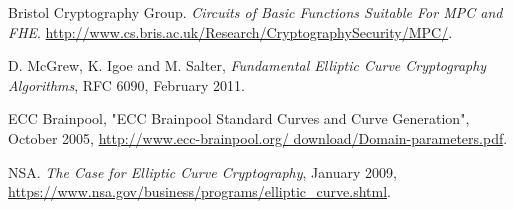 \documentclass[ %
                    author={Nicholas Tutte},
                supervisor={Prof. Nigel Smart},
                    degree={MEng},
                     title={Secure Two Party Computation},
                  subtitle={A practical comparison of recent protocols},
                      type={Research - GG1K},
                      year={2015} ]{dissertation}
\begin{document}
\begin{thebibliography}{99}
			Bristol Cryptography Group. \emph{Circuits of Basic Functions Suitable For MPC and FHE}.  \url{http://www.cs.bris.ac.uk/Research/CryptographySecurity/MPC/}. 

			D. McGrew, K. Igoe and M. Salter,\emph{ Fundamental Elliptic Curve Cryptography Algorithms}, RFC 6090, February 2011.

			ECC Brainpool, "ECC Brainpool Standard Curves and Curve
			Generation", October 2005, \url{http://www.ecc-brainpool.org/
			download/Domain-parameters.pdf}.

			NSA. \emph{The Case for Elliptic Curve Cryptography}, January 2009,
			\url{https://www.nsa.gov/business/programs/elliptic_curve.shtml}.
	\end{thebibliography}
\end{document}
